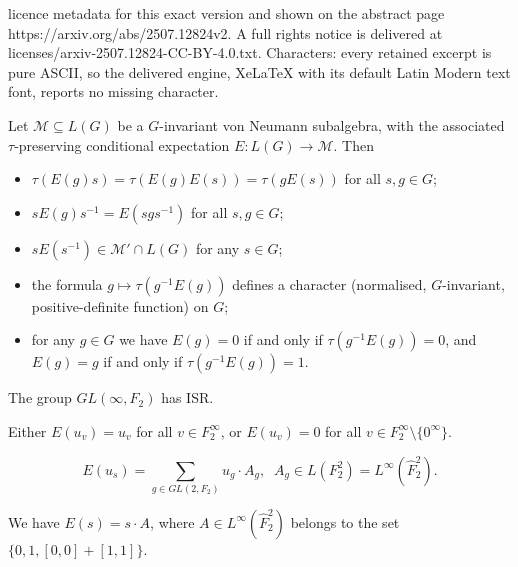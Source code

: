 \documentclass[10pt,a4paper]{amsart}
\begin{document}
licence metadata for this exact version and shown on the abstract page https://arxiv.org/abs/2507.12824v2. A full rights notice is delivered at licenses/arxiv-2507.12824-CC-BY-4.0.txt. Characters: every retained excerpt is pure ASCII, so the delivered engine, XeLaTeX with its default Latin Modern text font, reports no missing character.
\begin{proposition}\label{prop: E properties}
	Let $\mathcal M\subseteq L(G)$ be a $G$-invariant von Neumann subalgebra, with the associated $\tau$-preserving conditional expectation $E: L(G)\rightarrow \mathcal M$. Then
	\begin{itemize}
		\item[(1)] $\tau(E(g)s)=\tau(E(g)E(s))=\tau(gE(s))$ for all $s, g\in G$;
		\item[(2)] $sE(g)s^{-1}=E(sgs^{-1})$ for all $s, g\in G$;
		\item[(3)] $sE(s^{-1})\in\mathcal M'\cap L(G)$ for any $s\in G$;
		\item[(4)] the formula $g \mapsto \tau(g^{-1}E(g))$ defines a character (normalised, $G$-invariant, positive-definite function) on $G$;
		\item[(5)] for any $g \in G$ we have $E(g)=0$ if and only if $\tau(g^{-1}E(g))=0$, and $E(g) = g$ if and only if $\tau(g^{-1}E(g))=1$.
	\end{itemize}
\end{proposition}

\begin{proposition}\label{prop:(GLinfty,F2)_has_ISR}
	The group $GL(\infty,F_2)$ has ISR.
\end{proposition}

\begin{lemma}\label{cor: E(v)=0 or v}
Either $E(u_v)=u_v$ for all $v\in F_2^\infty$, or $E(u_v)=0$ for all $v\in F_2^\infty\setminus \{0^\infty\}$.
\end{lemma}

\begin{equation}\label{eq:E(01_10)}E(u_s)=\sum\limits_{g\in GL(2, F_2)}u_g\cdot A_g,\;\;A_g\in L( F_2^2)=L^\infty(\widehat{ F}_2^2).\end{equation} 

\begin{proposition}\label{lemma: E(01 10) for cross product}
We have  $E(s)=s\cdot A$, where $A\in  L^\infty(\widehat{ F}_2^2)$ belongs to the set $\{0,1,[0,0]+[1,1]\}$.
\end{proposition}
\end{document}
